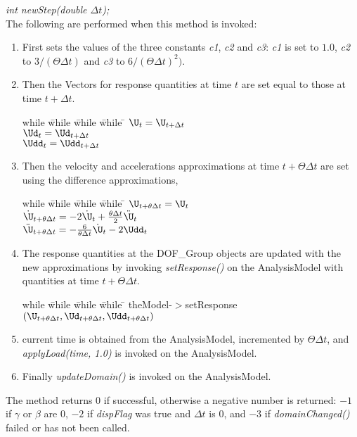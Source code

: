 {\em int newStep(double $\Delta t$);}\\
The following are performed when this method is invoked:
\begin{enumerate}
\item First sets the values of the three constants {\em c1}, {\em c2}
and {\em c3}: {\em c1} is set to $1.0$, 
{\em c2} to $3 / (\Theta
\Delta t)$ and {\em c3} to $6 / (\Theta \Delta t)^2)$. 
\item Then the Vectors for response quantities at time $t$ are set
equal to those at time $t + \Delta t$.
\begin{tabbing}
while \= while \= while \= while \= \kill
\>\> $ \U_t = \U_{t + \Delta t}$ \\
\>\> $ \Ud_t = \Ud_{t + \Delta t} $ \\
\>\> $ \Udd_t = \Udd_{t + \Delta t} $ 
\end{tabbing}
\item Then the velocity and accelerations approximations
at time $t + \Theta \Delta t$ are set using the difference
approximations,
\begin{tabbing}
while \= while \= while \= while \= \kill
\>\> $ \U_{t + \theta \Delta t} = \U_t $ \\
\>\> $ \dot \U_{t + \theta \Delta t} = - 2 \dot \U_t + \frac{\theta
\Delta t}{2} \ddot \U_t  $\\
\>\> $ \ddot \U_{t + \theta \Delta t} = - \frac{6}{\theta \Delta t}
\dot \U_t -2 \Udd_t $ 
\end{tabbing}
\item The response quantities at the DOF\_Group objects are updated
with the new approximations by invoking {\em setResponse()} on the
AnalysisModel with quantities at time $t + \Theta \Delta t$.
\begin{tabbing}
while \= while \= while \= while \= \kill
\>\> theModel-$>$setResponse$(\U_{t + \theta \Delta t}, \Ud_{t+\theta
\Delta t}, \Udd_{t+ \theta \Delta t})$ 
\end{tabbing}
\item current time is obtained from the AnalysisModel, incremented by
$\Theta \Delta t$, and {\em applyLoad(time, 1.0)} is invoked on the
AnalysisModel. 
\item Finally {\em updateDomain()} is invoked on the AnalysisModel.
\end{enumerate}
The method returns $0$ if successful, otherwise a negative number is
returned: $-1$ if $\gamma$ or $\beta$ are $0$, $-2$ if {\em dispFlag}
was true and $\Delta t$ is $0$, and $-3$ if {\em domainChanged()}
failed or has not been called. \\



